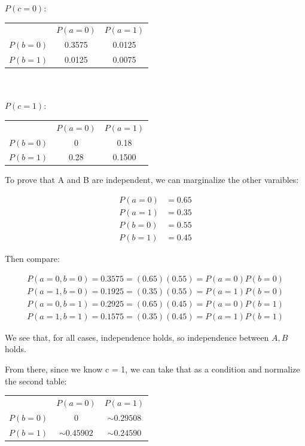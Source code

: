 \documentclass{article}
\begin{document}
$P(c = 0)$:

\begin{tabular}{r | c c}
               & $P(a = 0)$ & $P(a = 1)$ \\
    $P(b = 0)$ &     0.3575 &     0.0125 \\
    $P(b = 1)$ &     0.0125 &     0.0075
\end{tabular}

~\\
~\\

$P(c = 1)$:

\begin{tabular}{r | c c}
               & $P(a = 0)$ & $P(a = 1)$ \\
    $P(b = 0)$ &       0    &     0.18   \\
    $P(b = 1)$ &       0.28 &     0.1500   
\end{tabular}

To prove that A and B are independent, we can marginalize the other varaibles:

\begin{align*}
P(a = 0) &= 0.65 \\
P(a = 1) &= 0.35 \\
P(b = 0) &= 0.55 \\
P(b = 1) &= 0.45
\end{align*}

Then compare:

\begin{align*}
P(a = 0, b = 0) = 0.3575 = (0.65)(0.55) = P(a = 0)P(b = 0) \\
P(a = 1, b = 0) = 0.1925 = (0.35)(0.55) = P(a = 1)P(b = 0) \\
P(a = 0, b = 1) = 0.2925 = (0.65)(0.45) = P(a = 0)P(b = 1) \\
P(a = 1, b = 1) = 0.1575 = (0.35)(0.45) = P(a = 1)P(b = 1)
\end{align*}

We see that, for all cases, independence holds, so independence between $A, B$ holds.

From there, since we know c = 1, we can take that as a condition and normalize 
the second table:

\begin{tabular}{r | c c}
               & $P(a = 0)$     & $P(a = 1)$ \\
    $P(b = 0)$ & 0              & $\sim 0.29508$ \\
    $P(b = 1)$ & $\sim 0.45902$ & $\sim 0.24590$   
\end{tabular}
\end{document}
